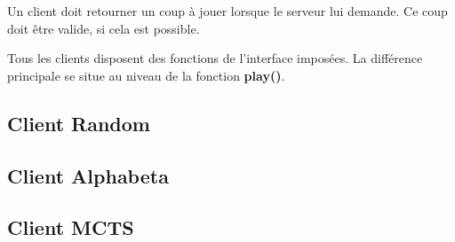 Un client doit retourner un coup à jouer lorsque le serveur lui demande.
Ce coup doit être valide, si cela est possible.

Tous les clients disposent des fonctions de l'interface imposées.
La différence principale se situe au niveau de la fonction \textbf{play()}.

\subsection{Client Random}
\subsection{Client Alphabeta}
\subsection{Client MCTS}
